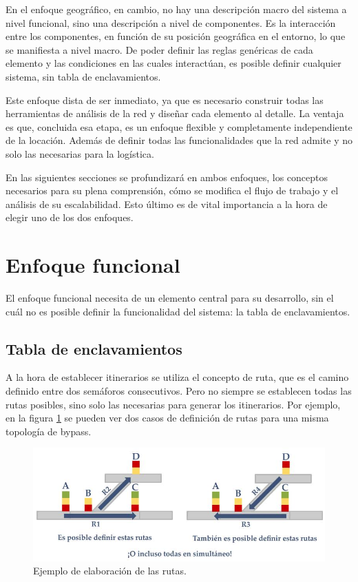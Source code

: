 	En el enfoque geográfico, en cambio, no hay una descripción macro del sistema a nivel funcional, sino una descripción a nivel de componentes. Es la interacción entre los componentes, en función de su posición geográfica en el entorno, lo que se manifiesta a nivel macro. De poder definir las reglas genéricas de cada elemento y las condiciones en las cuales interactúan, es posible definir cualquier sistema, sin tabla de enclavamientos.
	
	Este enfoque dista de ser inmediato, ya que es necesario construir todas las herramientas de análisis de la red y diseñar cada elemento al detalle. La ventaja es que, concluida esa etapa, es un enfoque flexible y completamente independiente de la locación. Además de definir todas las funcionalidades que la red admite y no solo las necesarias para la logística.
	
	En las siguientes secciones se profundizará en ambos enfoques, los conceptos necesarios para su plena comprensión, cómo se modifica el flujo de trabajo y el análisis de su escalabilidad. Esto último es de vital importancia a la hora de elegir uno de los dos enfoques.
	
	

\section{Enfoque funcional}
	\label{Incompletitud}
	
	El enfoque funcional necesita de un elemento central para su desarrollo, sin el cuál no es posible definir la funcionalidad del sistema: la tabla de enclavamientos.
	
	\subsection{Tabla de enclavamientos}
	
		A la hora de establecer itinerarios se utiliza el concepto de ruta, que es el camino definido entre dos semáforos consecutivos. Pero no siempre se establecen todas las rutas posibles, sino solo las necesarias para generar los itinerarios. Por ejemplo, en la figura \ref{fig:EJ_Tabla} se pueden ver dos casos de definición de rutas para una misma topología de bypass.
		
			\begin{figure}[h]
			\centering
				\includegraphics[scale=.5]{./Figures/Tablas}
				\caption{Ejemplo de elaboración de las rutas.} 
				\label{fig:EJ_Tabla}
			\end{figure}
		
